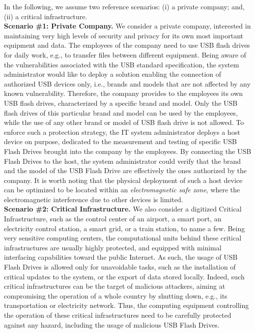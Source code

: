 \documentclass[acmsmall, authorversion]{acmart}
\begin{document}
In the following, we assume two reference scenarios: (i) a private company; and, (ii) a critical infrastructure.
\\
{\bf Scenario \#1: Private Company.} We consider a private company, interested in maintaining very high levels of security and privacy for its own most important equipment and data. The employees of the company need to use USB flash drives for daily work, e.g., to transfer files between different equipment. 
Being aware of the vulnerabilities associated with the USB standard specification, the system administrator would like to deploy a solution enabling the connection of authorized USB devices only, i.e., brands and models that are not affected by any known vulnerability.
Therefore, the company provides to the employees its own USB flash drives, characterized by a specific brand and model. Only the USB flash drives of this particular brand and model can be used by the employees, while the use of any other brand or model of USB flash drive is not allowed.
To enforce such a protection strategy, the IT system administrator deploys a host device on purpose, dedicated to the measurement and testing of specific USB Flash Drives brought into the company by the employees. By connecting the USB Flash Drives to the host, the system administrator could verify that the brand and the model of the USB Flash Drive are effectively the ones authorized by the company. It is worth noting that the physical deployment of such a host device can be optimized to be located within an \emph{electromagnetic safe zone}, where the electromagnetic interference due to other devices is limited.
\\
{\bf Scenario \#2: Critical Infrastructure.} We also consider a digitized Critical Infrastructure, such as the control center of an airport, a smart port, an electricity control station, a smart grid, or a train station, to name a few. Being very sensitive computing centers, the computational units behind these critical infrastructures are usually highly protected, and equipped with minimal interfacing capabilities toward the public Internet. As such, the usage of USB Flash Drives is allowed only for unavoidable tasks, such as the installation of critical updates to the system, or the export of data stored locally.
Indeed, such critical infrastructures can be the target of malicious attackers, aiming at compromising the operation of a whole country by shutting down, e.g., its transportation or electricity network. Thus, the computing equipment controlling the operation of these critical infrastructures need to be carefully protected against any hazard, including the usage of malicious USB Flash Drives. 
\end{document}
